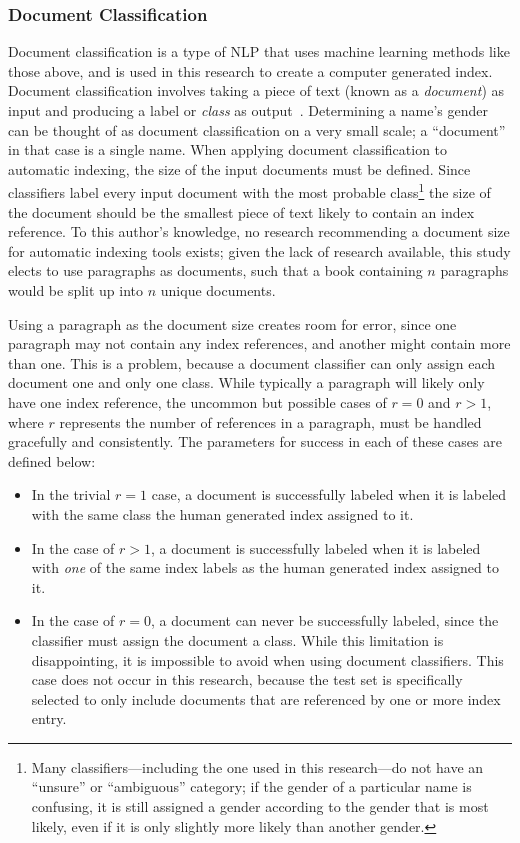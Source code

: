\subsubsection{Document Classification}
Document classification is a type of NLP that uses machine learning methods like those above, and is used in this research to create a computer generated index.
Document classification involves taking a piece of text (known as a {\it document}) as input and producing a label or {\it class} as output~\cite{jurafsky}.
Determining a name's gender can be thought of as document classification on a very small scale; a ``document'' in that case is a single name.
When applying document classification to automatic indexing, the size of the input documents must be defined.
Since classifiers label every input document with the most probable class\footnote{Many classifiers---including the one used in this research---do not have an ``unsure'' or ``ambiguous'' category; if the gender of a particular name is confusing, it is still assigned a gender according to the gender that is most likely, even if it is only slightly more likely than another gender.} the size of the document should be the smallest piece of text likely to contain an index reference.
To this author's knowledge, no research recommending a document size for automatic indexing tools exists; given the lack of research available, this study elects to use paragraphs as documents, such that a book containing $n$ paragraphs would be split up into $n$ unique documents.

Using a paragraph as the document size creates room for error, since one paragraph may not contain any index references, and another might contain more than one.
This is a problem, because a document classifier can only assign each document one and only one class.
While typically a paragraph will likely only have one index reference, the uncommon but possible cases of $r = 0$ and $r > 1$, where $r$ represents the number of references in a paragraph, must be handled gracefully and consistently.
The parameters for success in each of these cases are defined below:

\begin{itemize}
\item In the trivial $r = 1$ case, a document is successfully labeled when it is labeled with the same class the human generated index assigned to it.
\item In the case of $r > 1$, a document is successfully labeled when it is labeled with {\it one} of the same index labels as the human generated index assigned to it.
\item In the case of $r = 0$, a document can never be successfully labeled, since the classifier must assign the document a class. While this limitation is disappointing, it is impossible to avoid when using document classifiers. This case does not occur in this research, because the test set is specifically selected to only include documents that are referenced by one or more index entry.
\end{itemize}

